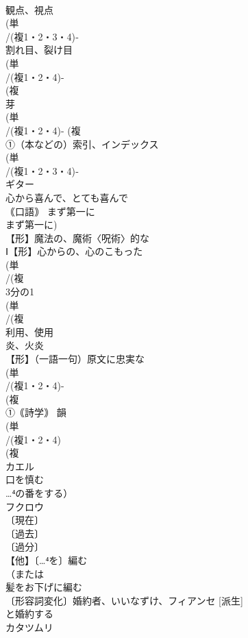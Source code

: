 \documentclass[8pt]{extreport}
\begin{document}
\begin{CJK}{UTF8}{min}
\\	観点、視点
\\	(単
\\	/(複1・2・3・4)‐
\\	割れ目、裂け目 
\\	(単
\\	/(複1・2・4)-
\\	(複
\\	芽 
\\	(単
\\	/(複1・2・4)- (複
\\	①（本などの）索引、インデックス
\\	(単
\\	/(複1・2・3・4)‐
\\	ギター 
\\	心から喜んで、とても喜んで
\\	｟口語｠ まず第一に 
\\	まず第一に)
\\	【形】魔法の、魔術〈呪術〉的な 
\\	Ⅰ【形】心からの、心のこもった 
\\	(単
\\	/(複
\\	3分の1
\\	(単
\\	/(複
\\	利用、使用 
\\	炎、火炎 
\\	【形】（一語一句）原文に忠実な 
\\	(単
\\	/(複1・2・4)-
\\	(複
\\	①｟詩学｠ 韻 
\\	(単
\\	/(複1・2・4)
\\	(複
\\	カエル 
\\	口を慎む 
\\	…⁴の番をする）
\\	フクロウ 
\\	〔現在〕
\\	〔過去〕
\\	〔過分〕
\\	【他】〔…⁴を〕編む 
\\	（または
\\	髪をお下げに編む
\\	〔形容詞変化〕婚約者、いいなずけ、フィアンセ [派生] 
\\	と婚約する
\\	カタツムリ 

\end{CJK}
\end{document}
